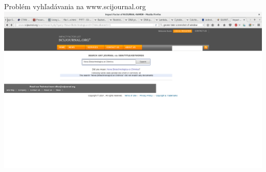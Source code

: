\documentclass{beamer}
\begin{document}
\begin{frame}{Problém vyhľadávania na www.scijournal.org}
  \centering
  \includegraphics[scale=0.18]{scijournal.png} 
\end{frame}
\end{document}
